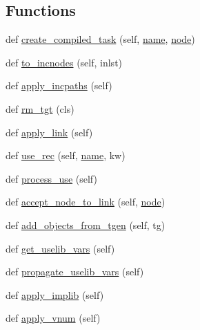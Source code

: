 \subsection*{Functions}
\begin{DoxyCompactItemize}
\item 
def \hyperlink{namespacewaflib_1_1_tools_1_1ccroot_aa2b134d88893eeede9656625b368d4df}{create\+\_\+compiled\+\_\+task} (self, \hyperlink{lib_2expat_8h_a1b49b495b59f9e73205b69ad1a2965b0}{name}, \hyperlink{structnode}{node})
\item 
def \hyperlink{namespacewaflib_1_1_tools_1_1ccroot_a9fab91da39fc8c94a2826622c25703e7}{to\+\_\+incnodes} (self, inlst)
\item 
def \hyperlink{namespacewaflib_1_1_tools_1_1ccroot_a209fe95a2d6634413b5e6773ba562536}{apply\+\_\+incpaths} (self)
\item 
def \hyperlink{namespacewaflib_1_1_tools_1_1ccroot_a064fb92f08a61ad149ebee72c996ff05}{rm\+\_\+tgt} (cls)
\item 
def \hyperlink{namespacewaflib_1_1_tools_1_1ccroot_acac52f2a19937efc730bbd89dcdb5557}{apply\+\_\+link} (self)
\item 
def \hyperlink{namespacewaflib_1_1_tools_1_1ccroot_af7254ab1c6dae3b1341666b00ff2f797}{use\+\_\+rec} (self, \hyperlink{lib_2expat_8h_a1b49b495b59f9e73205b69ad1a2965b0}{name}, kw)
\item 
def \hyperlink{namespacewaflib_1_1_tools_1_1ccroot_a0dfe9860a7d42293da74e5756a5f2dbd}{process\+\_\+use} (self)
\item 
def \hyperlink{namespacewaflib_1_1_tools_1_1ccroot_a799daddc37603b485a8ebc6d267f90e7}{accept\+\_\+node\+\_\+to\+\_\+link} (self, \hyperlink{structnode}{node})
\item 
def \hyperlink{namespacewaflib_1_1_tools_1_1ccroot_a5096365526f9a4345de471f11f55fc8f}{add\+\_\+objects\+\_\+from\+\_\+tgen} (self, tg)
\item 
def \hyperlink{namespacewaflib_1_1_tools_1_1ccroot_ae3a8e5a0dcca4c371c1e4aded647ba96}{get\+\_\+uselib\+\_\+vars} (self)
\item 
def \hyperlink{namespacewaflib_1_1_tools_1_1ccroot_a20d86827e2f92cf7e0a41c3e9a44298d}{propagate\+\_\+uselib\+\_\+vars} (self)
\item 
def \hyperlink{namespacewaflib_1_1_tools_1_1ccroot_ad50b323d3f7107b193b8aa67be013744}{apply\+\_\+implib} (self)
\item 
def \hyperlink{namespacewaflib_1_1_tools_1_1ccroot_a6aaa16b9cf69735b21b619635046773f}{apply\+\_\+vnum} (self)
\item 

\end{DoxyCompactItemize}
